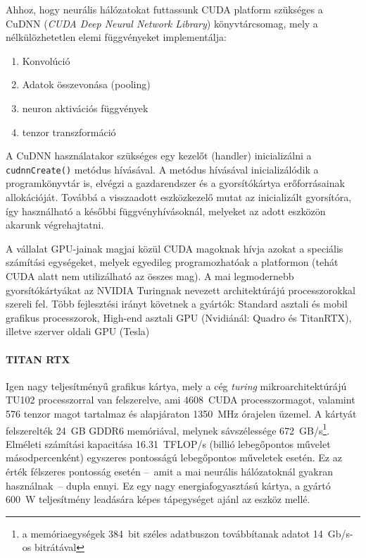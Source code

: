 Ahhoz, hogy neurális hálózatokat futtassunk CUDA platform szükséges a CuDNN (\emph{CUDA Deep Neural Network Library}) könyvtárcsomag, mely a nélkülözhetetlen elemi függvényeket implementálja:
\begin{enumerate}
	\item Konvolúció
	\item Adatok összevonása (pooling)
	\item neuron aktivációs függvények
	\item tenzor transzformáció
\end{enumerate}
A CuDNN használatakor szükséges egy kezelőt (handler) inicializálni a \verb|cudnnCreate()| metódus hívásával. A metódus hívásával inicializálódik a programkönyvtár is, elvégzi a gazdarendszer és a gyorsítókártya erőforrásainak allokációját. Továbbá a visszaadott eszközkezelő mutat az inicializált gyorsítóra, így használható a későbbi függvényhívásoknál, melyeket az adott eszközön akarunk végrehajtatni.

A vállalat GPU-jainak magjai közül CUDA magoknak hívja azokat a speciális számítási egységeket, melyek egyedileg programozhatóak a platformon (tehát CUDA alatt nem utilizálható az összes mag). A mai legmodernebb gyorsítókártyákat az NVIDIA Turingnak nevezett architektúrájú processzorokkal szereli fel.
Több fejlesztési irányt követnek a gyártók: Standard asztali és mobil grafikus processzorok, High-end asztali GPU (Nvidiánál: Quadro és TitanRTX\cite{spec:titan-rtx}), illetve szerver oldali GPU (Tesla\cite{spec:tesla-t4})
\paragraph{TITAN RTX}
Igen nagy teljesítményű grafikus kártya, mely a cég \emph{turing} mikroarchitektúrájú TU102 processzorral van felszerelve, ami 4608~CUDA processzormagot, valamint 576 tenzor magot tartalmaz és alapjáraton 1350~MHz órajelen üzemel. A kártyát felszerelték 24~GB GDDR6 memóriával, melynek sávszélessége 672~GB/s\footnote{a memóriaegységek 384~bit széles adatbuszon továbbítanak adatot 14~Gb/s-os bitrátával}. Elméleti számítási kapacitása 16.31~TFLOP/s (billió lebegőpontos művelet másodpercenként) egyszeres pontosságú lebegőpontos műveletek esetén. Ez az érték félszeres pontosság esetén --~amit a mai neurális hálózatoknál gyakran használnak~-- dupla ennyi. Ez egy nagy energiafogyasztású kártya, a gyártó 600~W teljesítmény leadására képes tápegységet ajánl az eszköz mellé.

